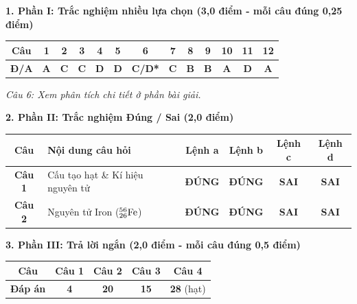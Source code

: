 \documentclass[11pt,a4paper]{article}
\begin{document}
\vspace{2pt}
\noindent
\textbf{\color{mainGreen}1. Phần I: Trắc nghiệm nhiều lựa chọn (3,0 điểm - mỗi câu đúng 0,25 điểm)}
\begin{center}
\renewcommand{\arraystretch}{1.2}
\begin{tabular}{|c|c|c|c|c|c|c|c|c|c|c|c|c|}
\hline
\rowcolor{tableGreen}
\textbf{Câu} & \textbf{1} & \textbf{2} & \textbf{3} & \textbf{4} & \textbf{5} & \textbf{6} & \textbf{7} & \textbf{8} & \textbf{9} & \textbf{10} & \textbf{11} & \textbf{12} \\
\hline
\textbf{Đ/A} & \textbf{\color{hfRed}A} & \textbf{\color{hfRed}C} & \textbf{\color{hfRed}C} & \textbf{\color{hfRed}D} & \textbf{\color{hfRed}D} & \textbf{\color{hfRed}C/D*} & \textbf{\color{hfRed}C} & \textbf{\color{hfRed}B} & \textbf{\color{hfRed}B} & \textbf{\color{hfRed}A} & \textbf{\color{hfRed}D} & \textbf{\color{hfRed}A} \\
\hline
\end{tabular}
\end{center}
\textit{\footnotesize * Câu 6: Xem phân tích chi tiết ở phần bài giải.}

\vspace{2pt}
\noindent
\textbf{\color{mainGreen}2. Phần II: Trắc nghiệm Đúng / Sai (2,0 điểm)}
\begin{center}
\renewcommand{\arraystretch}{1.2}
\begin{tabular}{|c|l|c|c|c|c|}
\hline
\rowcolor{tableGreen}
\textbf{Câu} & \textbf{Nội dung câu hỏi} & \textbf{Lệnh a} & \textbf{Lệnh b} & \textbf{Lệnh c} & \textbf{Lệnh d} \\
\hline
\textbf{Câu 1} & Cấu tạo hạt \& Kí hiệu nguyên tử & \textbf{\color{hfRed}ĐÚNG} & \textbf{\color{hfRed}ĐÚNG} & \textbf{SAI} & \textbf{SAI} \\
\hline
\textbf{Câu 2} & Nguyên tử Iron ($^{56}_{26}\ce{Fe}$) & \textbf{\color{hfRed}ĐÚNG} & \textbf{\color{hfRed}ĐÚNG} & \textbf{SAI} & \textbf{SAI} \\
\hline
\end{tabular}
\end{center}

\vspace{2pt}
\noindent
\textbf{\color{mainGreen}3. Phần III: Trả lời ngắn (2,0 điểm - mỗi câu đúng 0,5 điểm)}
\begin{center}
\renewcommand{\arraystretch}{1.2}
\begin{tabular}{|c|c|c|c|c|}
\hline
\rowcolor{tableGreen}
\textbf{Câu} & \textbf{Câu 1} & \textbf{Câu 2} & \textbf{Câu 3} & \textbf{Câu 4} \\
\hline
\textbf{Đáp án} & \textbf{\color{hfRed}4} & \textbf{\color{hfRed}20} & \textbf{\color{hfRed}15} & \textbf{\color{hfRed}28} (hạt) \\
\hline
\end{tabular}
\end{center}
\end{document}

